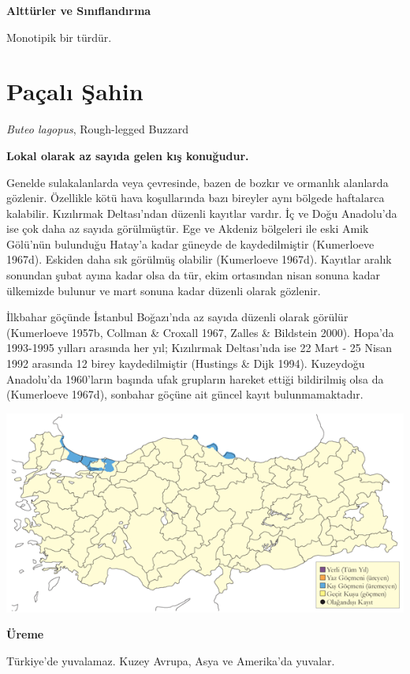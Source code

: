 \documentclass[
  letterpaper,
  DIV=11,
  numbers=noendperiod]{scrreprt}
\begin{document}
\textbf{Alttürler ve Sınıflandırma}

Monotipik bir türdür.

\section{Paçalı Şahin}\label{pauxe7alux131-ux15fahin}

\emph{Buteo lagopus}, Rough-legged Buzzard

\textbf{Lokal olarak az sayıda gelen kış konuğudur.}

Genelde sulakalanlarda veya çevresinde, bazen de bozkır ve ormanlık
alanlarda gözlenir. Özellikle kötü hava koşullarında bazı bireyler aynı
bölgede haftalarca kalabilir. Kızılırmak Deltası'ndan düzenli kayıtlar
vardır. İç ve Doğu Anadolu'da ise çok daha az sayıda görülmüştür. Ege ve
Akdeniz bölgeleri ile eski Amik Gölü'nün bulunduğu Hatay'a kadar güneyde
de kaydedilmiştir (Kumerloeve 1967d). Eskiden daha sık görülmüş olabilir
(Kumerloeve 1967d). Kayıtlar aralık sonundan şubat ayına kadar olsa da
tür, ekim ortasından nisan sonuna kadar ülkemizde bulunur ve mart sonuna
kadar düzenli olarak gözlenir.

İlkbahar göçünde İstanbul Boğazı'nda az sayıda düzenli olarak görülür
(Kumerloeve 1957b, Collman \& Croxall 1967, Zalles \& Bildstein 2000).
Hopa'da 1993-1995 yılları arasında her yıl; Kızılırmak Deltası'nda ise
22 Mart - 25 Nisan 1992 arasında 12 birey kaydedilmiştir (Hustings \&
Dijk 1994). Kuzeydoğu Anadolu'da 1960'ların başında ufak grupların
hareket ettiği bildirilmiş olsa da (Kumerloeve 1967d), sonbahar göçüne
ait güncel kayıt bulunmamaktadır.

\includegraphics{images/harita_Page_109.png}

\textbf{Üreme}

Türkiye'de yuvalamaz. Kuzey Avrupa, Asya ve Amerika'da yuvalar.
\end{document}
